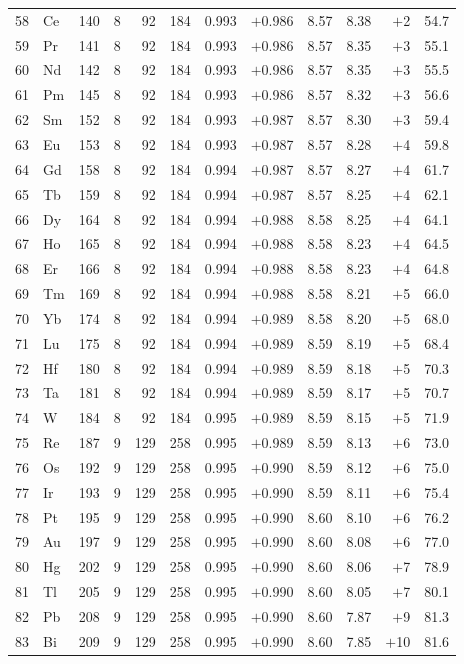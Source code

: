 \documentclass[twocolumn]{iopjournal}
\begin{document}
\begin{longtable}{r l r r r r r r r r r r}
58 & Ce & 140 & 8 &  92 & 184 & 0.993 & $+$0.986 &  8.57 &  8.38 & $+$2  & 54.7 \\
59 & Pr & 141 & 8 &  92 & 184 & 0.993 & $+$0.986 &  8.57 &  8.35 & $+$3  & 55.1 \\
60 & Nd & 142 & 8 &  92 & 184 & 0.993 & $+$0.986 &  8.57 &  8.35 & $+$3  & 55.5 \\
61 & Pm & 145 & 8 &  92 & 184 & 0.993 & $+$0.986 &  8.57 &  8.32 & $+$3  & 56.6 \\
62 & Sm & 152 & 8 &  92 & 184 & 0.993 & $+$0.987 &  8.57 &  8.30 & $+$3  & 59.4 \\
63 & Eu & 153 & 8 &  92 & 184 & 0.993 & $+$0.987 &  8.57 &  8.28 & $+$4  & 59.8 \\
64 & Gd & 158 & 8 &  92 & 184 & 0.994 & $+$0.987 &  8.57 &  8.27 & $+$4  & 61.7 \\
65 & Tb & 159 & 8 &  92 & 184 & 0.994 & $+$0.987 &  8.57 &  8.25 & $+$4  & 62.1 \\
66 & Dy & 164 & 8 &  92 & 184 & 0.994 & $+$0.988 &  8.58 &  8.25 & $+$4  & 64.1 \\
67 & Ho & 165 & 8 &  92 & 184 & 0.994 & $+$0.988 &  8.58 &  8.23 & $+$4  & 64.5 \\
68 & Er & 166 & 8 &  92 & 184 & 0.994 & $+$0.988 &  8.58 &  8.23 & $+$4  & 64.8 \\
69 & Tm & 169 & 8 &  92 & 184 & 0.994 & $+$0.988 &  8.58 &  8.21 & $+$5  & 66.0 \\
70 & Yb & 174 & 8 &  92 & 184 & 0.994 & $+$0.989 &  8.58 &  8.20 & $+$5  & 68.0 \\
71 & Lu & 175 & 8 &  92 & 184 & 0.994 & $+$0.989 &  8.59 &  8.19 & $+$5  & 68.4 \\
72 & Hf & 180 & 8 &  92 & 184 & 0.994 & $+$0.989 &  8.59 &  8.18 & $+$5  & 70.3 \\
73 & Ta & 181 & 8 &  92 & 184 & 0.994 & $+$0.989 &  8.59 &  8.17 & $+$5  & 70.7 \\
74 & W  & 184 & 8 &  92 & 184 & 0.995 & $+$0.989 &  8.59 &  8.15 & $+$5  & 71.9 \\
75 & Re & 187 & 9 & 129 & 258 & 0.995 & $+$0.989 &  8.59 &  8.13 & $+$6  & 73.0 \\
76 & Os & 192 & 9 & 129 & 258 & 0.995 & $+$0.990 &  8.59 &  8.12 & $+$6  & 75.0 \\
77 & Ir & 193 & 9 & 129 & 258 & 0.995 & $+$0.990 &  8.59 &  8.11 & $+$6  & 75.4 \\
78 & Pt & 195 & 9 & 129 & 258 & 0.995 & $+$0.990 &  8.60 &  8.10 & $+$6  & 76.2 \\
79 & Au & 197 & 9 & 129 & 258 & 0.995 & $+$0.990 &  8.60 &  8.08 & $+$6  & 77.0 \\
80 & Hg & 202 & 9 & 129 & 258 & 0.995 & $+$0.990 &  8.60 &  8.06 & $+$7  & 78.9 \\
81 & Tl & 205 & 9 & 129 & 258 & 0.995 & $+$0.990 &  8.60 &  8.05 & $+$7  & 80.1 \\
82 & Pb & 208 & 9 & 129 & 258 & 0.995 & $+$0.990 &  8.60 &  7.87 & $+$9  & 81.3 \\
83 & Bi & 209 & 9 & 129 & 258 & 0.995 & $+$0.990 &  8.60 &  7.85 & $+$10 & 81.6 \\
\end{longtable}
\end{document}
